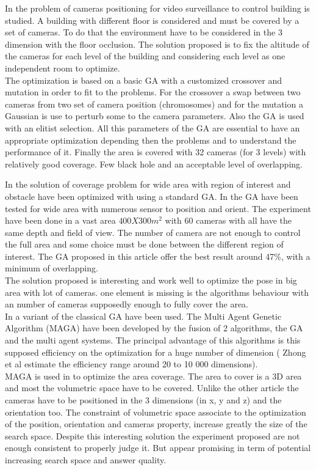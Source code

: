 In \cite{83*van2009} the problem of cameras positioning for video surveillance to control building is studied.  A building with different floor is considered and must be covered by a set of cameras. To do that the environment have to be considered in the 3 dimension with the floor occlusion. The solution proposed is to fix the altitude of the cameras for each level of the building and considering each level as one independent room to  optimize. \\
The optimization is based on a basic GA with a customized crossover and mutation in order to fit to the problems. For the crossover a swap between two cameras from two set of camera position (chromosomes) and for the mutation a Gaussian is use to perturb some to the camera parameters.  Also the GA is used with an elitist selection. All this parameters of the GA are essential to have an appropriate optimization depending then the problems and to understand the performance of it.  
Finally the area is covered with 32 cameras (for 3 levels) with relatively good coverage. Few black hole and an acceptable level of overlapping. 

In \cite{165*jiang2010} the solution of coverage problem for wide area with region of interest and obstacle have been optimized with using a standard GA.  In \cite{165*jiang2010} the GA have been tested for wide area with numerous sensor to position and orient. The experiment have been done in a vast area $400X300m^2$ with 60 cameras with all have the same depth and field of view. The number of camera are not enough to control the full area and some choice must be done between the different region of interest. The GA proposed in this article offer the best result around 47\%, with a minimum of overlapping. \\
The solution proposed is interesting and work well to optimize the pose in big area with  lot of cameras. one element is missing is the algorithms behaviour with an number of cameras supposedly enough to fully  cover the area.\\

In \cite{152*wang2009} a variant of the classical GA have been used. The Multi Agent Genetic Algorithm (MAGA) \cite{223*zhong2004} have been developed by the fusion of 2 algorithms, the GA and the multi agent systems. The principal advantage of this algorithms is this supposed efficiency on the optimization for a huge number of dimension ( Zhong et al  estimate the efficiency range around 20 to 10 000 dimensions).\\
MAGA is used in \cite{152*wang2009} to optimize the area coverage. The area to cover is a 3D area and most the volumetric space have to be covered.  Unlike the other article the cameras have to be positioned in the 3 dimensions (in x, y and z) and the orientation too. The constraint of volumetric space associate to the optimization of the position, orientation and cameras property, increase greatly the size of the search space.  
Despite this interesting solution the experiment proposed are not enough consistent to properly judge it. But appear promising  in term of  potential increasing search space and answer quality. 

